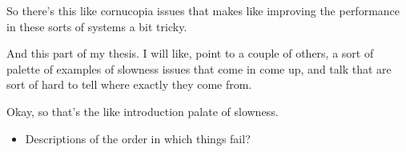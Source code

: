 \begin{subappendices}
So there's this like cornucopia issues that makes like improving the performance in these sorts of systems a bit tricky. 

And this part of my thesis. I will like, point to a couple of others, a sort of palette of examples of slowness issues that come in come up, and talk that are sort of hard to tell where exactly they come from.

Okay, so that's the like introduction palate of slowness.


\begin{itemize}
\item Descriptions of the order in which things fail?
\end{itemize}
\end{subappendices}